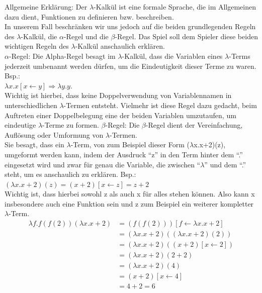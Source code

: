 \documentclass{scrartcl}
\begin{document}
\begin{description}

	\begin{minipage}{1\textwidth}
	\item[Allgemeine Erklärung:] \label{LambdaKalkül:AlgemeineErklärung} Der $\lambda$-Kalkül ist eine formale Sprache, die im Allgemeinen dazu dient, Funktionen zu definieren bzw. beschreiben.\\
	In unserem Fall beschränken wir uns jedoch auf die beiden grundlegenden Regeln des $\lambda$-Kalkül, die $\alpha$-Regel und die $\beta$-Regel. Das Spiel soll dem Spieler diese beiden wichtigen Regeln des $\lambda$-Kalkül anschaulich erklären.\\
	$\alpha$-Regel: Die Alpha-Regel besagt im $\lambda$-Kalkül, dass die Variablen eines $\lambda$-Terms jederzeit umbenannt werden dürfen, um die Eindeutigkeit dieser Terme zu waren. Bsp.:\\
	$\lambda x.x [x \leftarrow y] \Rightarrow \lambda y.y.$\\
	Wichtig ist hierbei, dass keine Doppelverwendung von Variablennamen in unterschiedlichen $\lambda$-Termen entsteht. Vielmehr ist diese Regel dazu gedacht, beim Auftreten einer Doppelbelegung eine der beiden Variablen umzutaufen, um eindeutige $\lambda$-Terme zu formen.
	$\beta$-Regel: Die $\beta$-Regel dient der Vereinfachung, Auflösung oder Umformung von $\lambda$-Termen.\\
	Sie besagt, dass ein $\lambda$-Term, von zum Beispiel dieser Form ($\lambda$x.x+2)(z), umgeformt werden kann, indem der Ausdruck ``z'' in den Term hinter dem ``.'' eingesetzt wird und zwar für genau die Variable, die zwischen ``$\lambda$'' und dem ``.'' steht, um es anschaulich zu erklären. Bsp.:\\
	$(\lambda x.x+2)(z) = (x+2)[x \leftarrow z] = z + 2$ \\
	Wichtig ist, dass hierbei sowohl z als auch x für alles stehen können. Also kann x insbesondere auch eine Funktion sein und z zum Beispiel ein weiterer kompletter $\lambda$-Term.
	\[
		\begin{aligned}
			\lambda f.f(f(2))(\lambda x.x+2)&= (f(f(2)))[f \leftarrow \lambda x.x+2] \\
			&= (\lambda x.x+2)((\lambda x.x+2)(2)) \\
			&= (\lambda x.x+2)((x+2)[x \leftarrow 2]) \\
			&= (\lambda x.x+2)(2 + 2) \\
			&= (\lambda x.x+2)(4) \\
			&= (x+2)[x \leftarrow 4] \\
			&= 4 + 2 = 6
		\end{aligned}
	\]
	\end{minipage}
							
\end{description}
\end{document}

